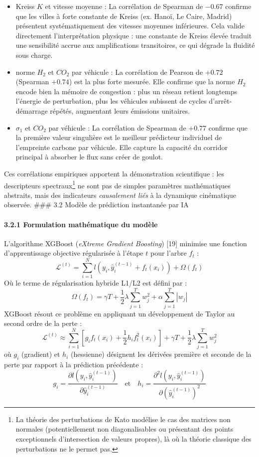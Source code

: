 \documentclass[10pt, a4paper]{article}
\providecommand{\tightlist}{}
\begin{document}
\begin{itemize}
\tightlist
\item
  Kreiss \(K\) et vitesse moyenne : La corrélation de Spearman de
  \(-0.67\) confirme que les villes à forte constante de Kreiss (ex.
  Hanoï, Le Caire, Madrid) présentent systématiquement des vitesses
  moyennes inférieures. Cela valide directement l'interprétation
  physique : une constante de Kreiss élevée traduit une sensibilité
  accrue aux amplifications transitoires, ce qui dégrade la fluidité
  sous charge.
\item
  norme \(H_2\) et \(CO_2\) par véhicule : La corrélation de Pearson de
  \(+0.72\) (Spearman \(+0.74\)) est la plus forte mesurée. Elle
  confirme que la norme \(H_2\) encode bien la mémoire de congestion :
  plus un réseau retient longtemps l'énergie de perturbation, plus les
  véhicules subissent de cycles d'arrêt-démarrage répétés, augmentant
  leurs émissions unitaires.
\item
  \(\sigma_1\) et \(CO_2\) par véhicule : La corrélation de Spearman de
  \(+0.77\) confirme que la première valeur singulière est le meilleur
  prédicteur individuel de l'empreinte carbone par véhicule. Elle
  capture la capacité du corridor principal à absorber le flux sans
  créer de goulot.
\end{itemize}

Ces corrélations empiriques apportent la démonstration scientifique :
les descripteurs
spectraux\footnote{La théorie des perturbations de Kato modélise le cas des matrices non normales (potentiellement non diagonalisables ou présentant des points exceptionnels d'intersection de valeurs propres), là où la théorie classique des perturbations ne le permet pas.}
ne sont pas de simples paramètres mathématiques abstraits, mais des
indicateurs \emph{causalement liés} à la dynamique cinématique observée.
\#\#\# 3.2 Modèle de prédiction instantanée par IA

\paragraph{3.2.1 Formulation mathématique du
modèle}\label{formulation-mathuxe9matique-du-moduxe8le}

L'algorithme XGBoost (\emph{eXtreme Gradient Boosting}) {[}19{]}
minimise une fonction d'apprentissage objective régularisée à l'étape
\(t\) pour l'arbre \(f_t\) :
\[\mathcal{L}^{(t)} = \sum_{i=1}^N l\left(y_i, \hat{y}_i^{(t-1)} + f_t(x_i)\right) + \Omega(f_t)\]
Où le terme de régularisation hybride L1/L2 est défini par :
\[\Omega(f_t) = \gamma T + \frac{1}{2} \lambda \sum_{j=1}^T w_j^2 + \alpha \sum_{j=1}^T |w_j|\]
XGBoost résout ce problème en appliquant un développement de Taylor au
second ordre de la perte :
\[\mathcal{L}^{(t)} \approx \sum_{i=1}^N \left[ g_i f_t(x_i) + \frac{1}{2} h_i f_t^2(x_i) \right] + \gamma T + \frac{1}{2} \lambda \sum_{j=1}^T w_j^2\]
où \(g_i\) (gradient) et \(h_i\) (hessienne) désignent les dérivées
première et seconde de la perte par rapport à la prédiction précédente :
\[g_i = \frac{\partial l\left(y_i, \hat{y}_i^{(t-1)}\right)}{\partial \hat{y}_i^{(t-1)}} \quad \text{et} \quad h_i = \frac{\partial^2 l\left(y_i, \hat{y}_i^{(t-1)}\right)}{\partial \left(\hat{y}_i^{(t-1)}\right)^2}\]
\end{document}
